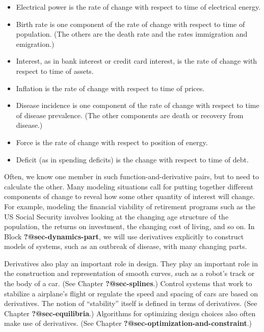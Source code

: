 \documentclass[
  letterpaper,
  DIV=11,
  numbers=noendperiod,
  oneside]{scrreprt}
\providecommand{\tightlist}{%
  \setlength{\itemsep}{0pt}\setlength{\parskip}{0pt}}
\begin{document}
\begin{itemize}
\tightlist
\item
  Electrical power is the rate of change with respect to time of
  electrical energy.
\item
  Birth rate is one component of the rate of change with respect to time
  of population. (The others are the death rate and the rates
  immigration and emigration.)
\item
  Interest, as in bank interest or credit card interest, is the rate of
  change with respect to time of assets.
\item
  Inflation is the rate of change with respect to time of prices.
\item
  Disease incidence is one component of the rate of change with respect
  to time of disease prevalence. (The other components are death or
  recovery from disease.)
\item
  Force is the rate of change with respect to position of energy.
\item
  Deficit (as in spending deficits) is the change with respect to time
  of debt.
\end{itemize}

Often, we know one member in such function-and-derivative pairs, but to
need to calculate the other. Many modeling situations call for putting
together different components of change to reveal how some other
quantity of interest will change. For example, modeling the financial
viability of retirement programs such as the US Social Security involves
looking at the changing age structure of the population, the returns on
investment, the changing cost of living, and so on. In Block
\textbf{?@sec-dynamics-part}, we will use derivatives explicitly to
construct models of systems, such as an outbreak of disease, with many
changing parts.

Derivatives also play an important role in design. They play an
important role in the construction and representation of smooth curves,
such as a robot's track or the body of a car. (See Chapter
\textbf{?@sec-splines}.) Control systems that work to stabilize a
airplane's flight or regulate the speed and spacing of cars are based on
derivatives. The notion of ``stability'' itself is defined in terms of
derivatives. (See Chapter \textbf{?@sec-equilibria}.) Algorithms for
optimizing design choices also often make use of derivatives. (See
Chapter \textbf{?@sec-optimization-and-constraint}.)
\end{document}
